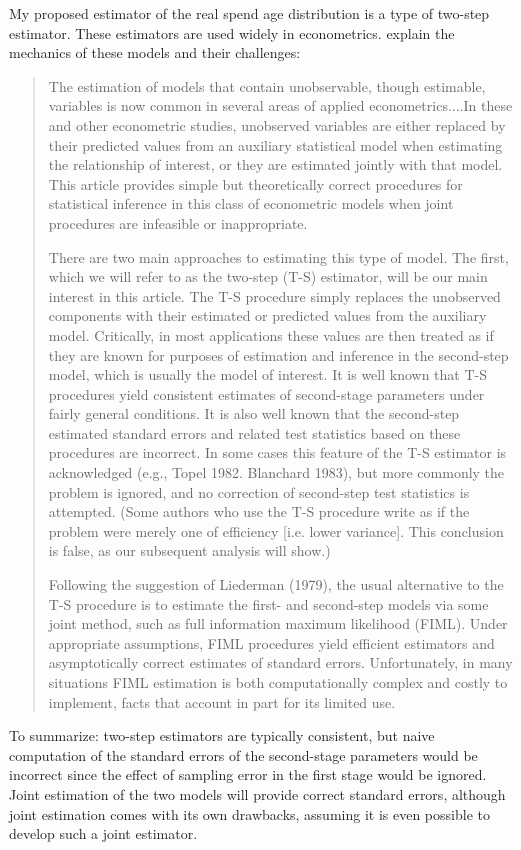 \documentclass[english]{article}
\begin{document}
My proposed estimator of the real spend age distribution is a type
of two-step estimator. These estimators are used  widely in econometrics.\cite{Murphy1985}
explain the mechanics of these models and their challenges:
\begin{quote}
The estimation of models that contain unobservable, though estimable,
variables is now common in several areas of applied econometrics....In
these and other econometric studies, unobserved variables are either
replaced by their predicted values from an auxiliary statistical model
when estimating the relationship of interest, or they are estimated
jointly with that model. This article provides simple but theoretically
correct procedures for statistical inference in this class of econometric
models when joint procedures are infeasible or inappropriate. 

There are two main approaches to estimating this type of model. The
first, which we will refer to as the two-step (T-S) estimator, will
be our main interest in this article. The T-S procedure simply replaces
the unobserved components with their estimated or predicted values
from the auxiliary model. Critically, in most applications these values
are then treated as if they are known for purposes of estimation and
inference in the second-step model, which is usually the model of
interest. It is well known that T-S procedures yield consistent estimates
of second-stage parameters under fairly general conditions. It is
also well known that the second-step estimated standard errors and
related test statistics based on these procedures are incorrect. In
some cases this feature of the T-S estimator is acknowledged (e.g.,
Topel 1982. Blanchard 1983), but more commonly the problem is ignored,
and no correction of second-step test statistics is attempted. (Some
authors who use the T-S procedure write as if the problem were merely
one of efficiency {[}i.e. lower variance{]}. This conclusion is false,
as our subsequent analysis will show.)

Following the suggestion of Liederman (1979), the usual alternative
to the T-S procedure is to estimate the first- and second-step models
via some joint method, such as full information maximum likelihood
(FIML). Under appropriate assumptions, FIML procedures yield efficient
estimators and asymptotically correct estimates of standard errors.
Unfortunately, in many situations FIML estimation is both computationally
complex and costly to implement, facts that account in part for its
limited use.
\end{quote}
To summarize: two-step estimators are typically consistent, but naive
computation of the standard errors of the second-stage parameters
would be incorrect since the effect of sampling error in the first
stage would be ignored. Joint estimation of the two models will provide
correct standard errors, although joint estimation comes with its
own drawbacks, assuming it is even possible to develop such a joint
estimator.
\end{document}
